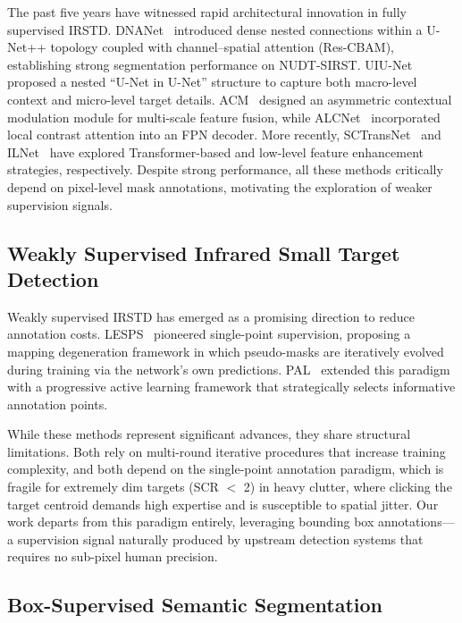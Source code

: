 The past five years have witnessed rapid architectural innovation in fully supervised
IRSTD.
DNANet~\cite{dnanet} introduced dense nested connections within a U-Net++ topology
coupled with channel--spatial attention (Res-CBAM), establishing strong segmentation
performance on NUDT-SIRST.
UIU-Net~\cite{uiunet} proposed a nested ``U-Net in U-Net'' structure to capture both
macro-level context and micro-level target details.
ACM~\cite{acm} designed an asymmetric contextual modulation module for multi-scale
feature fusion, while ALCNet~\cite{alcnet} incorporated local contrast attention into
an FPN decoder.
More recently, SCTransNet~\cite{sctransnet} and ILNet~\cite{ilnet} have explored
Transformer-based and low-level feature enhancement strategies, respectively.
Despite strong performance, all these methods critically depend on pixel-level mask
annotations, motivating the exploration of weaker supervision signals.

\subsection{Weakly Supervised Infrared Small Target Detection}
\label{sec:related_ws}

Weakly supervised IRSTD has emerged as a promising direction to reduce annotation costs.
LESPS~\cite{lesps} pioneered single-point supervision, proposing a mapping degeneration
framework in which pseudo-masks are iteratively evolved during training via the network's
own predictions.
PAL~\cite{pal} extended this paradigm with a progressive active learning framework that
strategically selects informative annotation points.

While these methods represent significant advances, they share structural limitations.
Both rely on multi-round iterative procedures that increase training complexity, and both
depend on the single-point annotation paradigm, which is fragile for extremely dim targets
(SCR $<$ 2) in heavy clutter, where clicking the target centroid demands high expertise
and is susceptible to spatial jitter.
Our work departs from this paradigm entirely, leveraging bounding box annotations---a
supervision signal naturally produced by upstream detection systems that requires no
sub-pixel human precision.

\subsection{Box-Supervised Semantic Segmentation}
\label{sec:related_box}

